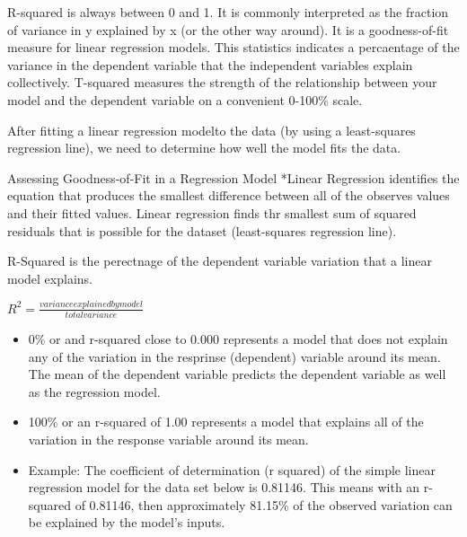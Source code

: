 \documentclass[]{article}
\newenvironment{Shaded}{\begin{snugshade}}{\end{snugshade}}
\newcommand{\CommentTok}[1]{\textcolor[rgb]{0.56,0.35,0.01}{\textit{#1}}}
\newcommand{\DataTypeTok}[1]{\textcolor[rgb]{0.13,0.29,0.53}{#1}}
\newcommand{\KeywordTok}[1]{\textcolor[rgb]{0.13,0.29,0.53}{\textbf{#1}}}
\newcommand{\NormalTok}[1]{#1}
\newcommand{\OperatorTok}[1]{\textcolor[rgb]{0.81,0.36,0.00}{\textbf{#1}}}
\newcommand{\StringTok}[1]{\textcolor[rgb]{0.31,0.60,0.02}{#1}}
\begin{document}
R-squared is always between 0 and 1. It is commonly interpreted as the
fraction of variance in y explained by x (or the other way around). It
is a goodness-of-fit measure for linear regression models. This
statistics indicates a percaentage of the variance in the dependent
variable that the independent variables explain collectively. T-squared
measures the strength of the relationship between your model and the
dependent variable on a convenient 0-100\% scale.

After fitting a linear regression modelto the data (by using a
least-squares regression line), we need to determine how well the model
fits the data.

Assessing Goodness-of-Fit in a Regression Model *Linear Regression
identifies the equation that produces the smallest difference between
all of the observes values and their fitted values. Linear regression
finds thr smallest sum of squared residuals that is possible for the
dataset (least-squares regression line).

R-Squared is the perectnage of the dependent variable variation that a
linear model explains.

\(R^2 = \frac{variance explained by model}{total variance}\)

\begin{itemize}
\item
  0\% or and r-squared close to 0.000 represents a model that does not
  explain any of the variation in the resprinse (dependent) variable
  around its mean. The mean of the dependent variable predicts the
  dependent variable as well as the regression model.
\item
  100\% or an r-squared of 1.00 represents a model that explains all of
  the variation in the response variable around its mean.
\item
  Example: The coefficient of determination (r squared) of the simple
  linear regression model for the data set below is 0.81146. This means
  with an r-squared of 0.81146, then approximately 81.15\% of the
  observed variation can be explained by the model's inputs.
\end{itemize}

\begin{Shaded}
\end{Shaded}
\end{document}
